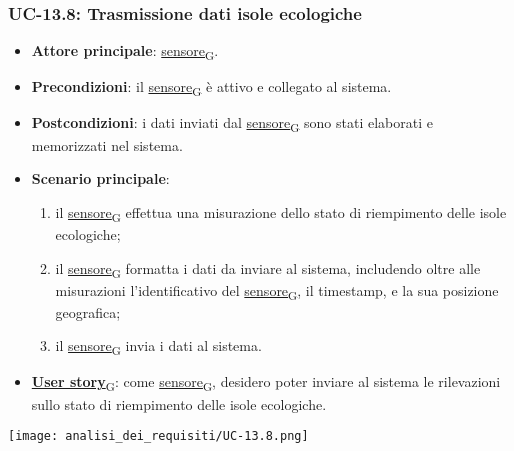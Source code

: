 \newpage

\subsubsection{UC-13.8: Trasmissione dati isole ecologiche}
\begin{itemize}
	\item \textbf{Attore principale}: \href{https://7last.github.io/docs/rtb/documentazione-interna/glossario\#sensore}{sensore\textsubscript{G}}.
	\item \textbf{Precondizioni}: il \href{https://7last.github.io/docs/rtb/documentazione-interna/glossario\#sensore}{sensore\textsubscript{G}} è attivo e collegato al sistema.
	\item \textbf{Postcondizioni}: i dati inviati dal \href{https://7last.github.io/docs/rtb/documentazione-interna/glossario\#sensore}{sensore\textsubscript{G}} sono stati elaborati e memorizzati nel sistema.
	\item \textbf{Scenario principale}:
	      \begin{enumerate}
		      \item il \href{https://7last.github.io/docs/rtb/documentazione-interna/glossario\#sensore}{sensore\textsubscript{G}} effettua una misurazione dello stato di riempimento delle isole ecologiche;
		      \item il \href{https://7last.github.io/docs/rtb/documentazione-interna/glossario\#sensore}{sensore\textsubscript{G}} formatta i dati da inviare al sistema, includendo oltre alle misurazioni l'identificativo del \href{https://7last.github.io/docs/rtb/documentazione-interna/glossario\#sensore}{sensore\textsubscript{G}},
		            il timestamp, e la sua posizione geografica;
		      \item il \href{https://7last.github.io/docs/rtb/documentazione-interna/glossario\#sensore}{sensore\textsubscript{G}} invia i dati al sistema.
	      \end{enumerate}
	\item \href{https://7last.github.io/docs/rtb/documentazione-interna/glossario\#user-story}{\textbf{User story}\textsubscript{G}}: come \href{https://7last.github.io/docs/rtb/documentazione-interna/glossario\#sensore}{sensore\textsubscript{G}}, desidero poter inviare al sistema le rilevazioni sullo stato di riempimento delle isole ecologiche.
\end{itemize}

\begin{center}
	\texttt{[image: analisi\_dei\_requisiti/UC-13.8.png]}
\end{center}

